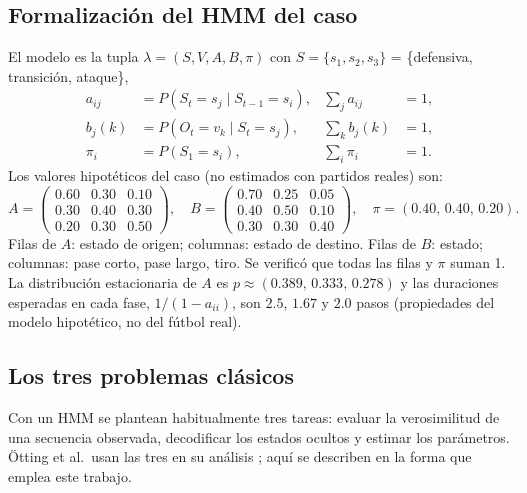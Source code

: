 \documentclass[11pt,a4paper]{article}
\begin{document}
\subsection{Formalización del HMM del caso}
El modelo es la tupla $\lambda=(S,V,A,B,\pi)$ con
$S=\{s_1,s_2,s_3\}$ = \{defensiva, transición, ataque\},
\begin{align}
a_{ij}&=P(S_t=s_j\mid S_{t-1}=s_i), & \textstyle\sum_j a_{ij}&=1,\\
b_j(k)&=P(O_t=v_k\mid S_t=s_j), & \textstyle\sum_k b_j(k)&=1,\\
\pi_i&=P(S_1=s_i), & \textstyle\sum_i \pi_i&=1.
\end{align}
Los valores hipotéticos del caso (no estimados con partidos reales) son:
\begin{equation}
A=\begin{pmatrix}0.60&0.30&0.10\\0.30&0.40&0.30\\0.20&0.30&0.50\end{pmatrix},\quad
B=\begin{pmatrix}0.70&0.25&0.05\\0.40&0.50&0.10\\0.30&0.30&0.40\end{pmatrix},\quad
\pi=(0.40,\,0.40,\,0.20).
\end{equation}
Filas de $A$: estado de origen; columnas: estado de destino. Filas de $B$:
estado; columnas: pase corto, pase largo, tiro. Se verificó que todas las filas
y $\pi$ suman 1. La distribución estacionaria de $A$ es
$p\approx(0.389,\,0.333,\,0.278)$ y las duraciones esperadas en cada fase,
$1/(1-a_{ii})$, son $2.5$, $1.67$ y $2.0$ pasos (propiedades del modelo
hipotético, no del fútbol real).

\subsection{Los tres problemas clásicos}
Con un HMM se plantean habitualmente tres tareas: evaluar la verosimilitud de
una secuencia observada, decodificar los estados ocultos y estimar los
parámetros. Ötting et al.\ usan las tres en su análisis
\cite[pp.~14--15, 22]{otting2023}; aquí se describen en la forma que emplea
este trabajo.
\end{document}
